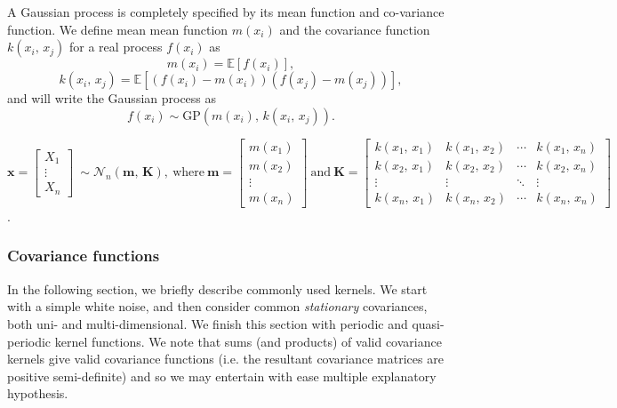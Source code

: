       \vspace{1em}

      A Gaussian process is completely specified by its mean function and co-variance function. We define mean mean function \(m(x_{i})\) and the covariance function \(k(x_{i},\, x_{j})\) for a real process \(f(x_{i})\) as
      \[m(x_{i}) = \mathbb{E}[f(x_{i})],\]
      \[k(x_{i},\, x_{j}) = \mathbb{E}[(f(x_{i}) - m(x_{i}))(f(x_{j}) - m(x_{j}))],\]
      and will write the Gaussian process as
      \[f(x_{i}) \sim \text{GP}(m(x_{i}), \, k(x_{i},\, x_{j})).\]

      \(\mathbf{x} =
      \begin{bmatrix}
         X_{1} \\
         \vdots \\
         X_{n}
      \end{bmatrix}
      \:
      \sim \mathcal{N}_{n}(\mathbf{m}, \, \mathbf{K}),
      \:
      \text{where}
      \:
      \mathbf{m} = 
      \begin{bmatrix}
         m(x_{1}) \\
         m(x_{2}) \\
         \vdots \\
         m(x_{n})
      \end{bmatrix}  
      \: 
      \text{and}
      \:
      \mathbf{K} = 
      \begin{bmatrix}
         k(x_{1}, \, x_{1}) & k(x_{1}, \, x_{2}) & \cdots & k(x_{1}, \, x_{n}) \\
         k(x_{2}, \, x_{1}) & k(x_{2}, \, x_{2}) & \cdots & k(x_{2}, \, x_{n}) \\
         \vdots & \vdots & \ddots & \vdots \\
         k(x_{n}, \, x_{1}) & k(x_{n}, \, x_{2}) & \cdots & k(x_{n}, \, x_{n})
      \end{bmatrix}\).

      \subsubsection{Covariance functions}

         \cite{Roberts2013} In the following section, we briefly describe commonly used kernels. We start with a simple white noise, and then consider common \textit{stationary} covariances, both uni- and multi-dimensional. We finish this section with periodic and quasi-periodic kernel functions. We note that sums (and products) of valid covariance kernels give valid covariance functions (i.e. the resultant covariance matrices are positive semi-definite) and so we may entertain with ease multiple explanatory hypothesis. 

